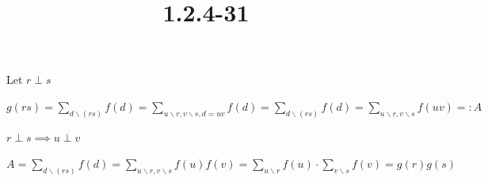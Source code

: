 \documentclass{article}
\title{1.2.4-31}
\begin{document}
\maketitle

Let \( r \perp s \)

\( g(rs) = \sum_{d \backslash (rs)} f(d) = \sum_{u\backslash r, v \backslash s, d = uv} f(d) = \sum_{d \backslash (rs)} f(d) = \sum_{u\backslash r, v \backslash s} f(uv) =: A \)

\( r \perp s \implies u \perp v \)

\( A = \sum_{d \backslash (rs)} f(d) = \sum_{u\backslash r, v \backslash s} f(u)f(v) = \sum_{u\backslash r} f(u) \cdot \sum_{v\backslash s} f(v) = g(r)g(s) \)
\end{document}
